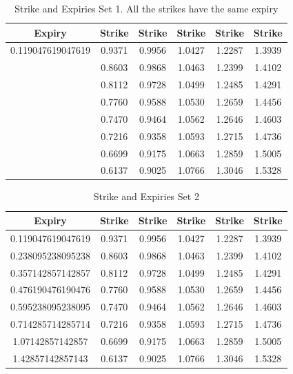 \documentclass[12,twoside]{mammeTFM}
\theoremstyle{definition}
\theoremstyle{remark}
\begin{document}
\begin{table}[!h]
\begin{center}
 \begin{tabular}{|c | c | c | c | c | c |} 
 \hline
 Expiry & Strike & Strike & Strike & Strike & Strike \\ [0.5ex] 
 \hline
 0.119047619047619 & 0.9371 & 0.9956 & 1.0427 & 1.2287 & 1.3939 \\
\hline
 & 0.8603 & 0.9868 & 1.0463 & 1.2399 & 1.4102 \\
\hline
 & 0.8112 & 0.9728 & 1.0499 & 1.2485 & 1.4291 \\
\hline
 & 0.7760 & 0.9588 & 1.0530 & 1.2659 & 1.4456 \\
\hline
 & 0.7470 & 0.9464 & 1.0562 & 1.2646 & 1.4603 \\
\hline
 & 0.7216 & 0.9358 & 1.0593 & 1.2715 & 1.4736 \\
\hline
 & 0.6699 & 0.9175 & 1.0663 & 1.2859 & 1.5005 \\
\hline
 & 0.6137 & 0.9025 & 1.0766 & 1.3046 & 1.5328 \\
 \hline
\end{tabular}
\caption{Strike and Expiries Set 1. All the strikes have the same expiry}\label{table:set1}
\end{center}
\end{table}

\begin{table}[!h]
\begin{center}
 \begin{tabular}{|c | c | c | c | c | c |} 
 \hline
 Expiry & Strike & Strike & Strike & Strike & Strike \\ [0.5ex] 
 \hline
 0.119047619047619 & 0.9371 & 0.9956 & 1.0427 & 1.2287 & 1.3939 \\
\hline
0.238095238095238 & 0.8603 & 0.9868 & 1.0463 & 1.2399 & 1.4102 \\
\hline
0.357142857142857 & 0.8112 & 0.9728 & 1.0499 & 1.2485 & 1.4291 \\
\hline
0.476190476190476 & 0.7760 & 0.9588 & 1.0530 & 1.2659 & 1.4456 \\
\hline
0.595238095238095 & 0.7470 & 0.9464 & 1.0562 & 1.2646 & 1.4603 \\
\hline
0.714285714285714 & 0.7216 & 0.9358 & 1.0593 & 1.2715 & 1.4736 \\
\hline
1.07142857142857 & 0.6699 & 0.9175 & 1.0663 & 1.2859 & 1.5005 \\
\hline
1.42857142857143 & 0.6137 & 0.9025 & 1.0766 & 1.3046 & 1.5328 \\
 \hline
\end{tabular}
\caption{Strike and Expiries Set 2}\label{table:set2}
\end{center}
\end{table}
\end{document}

